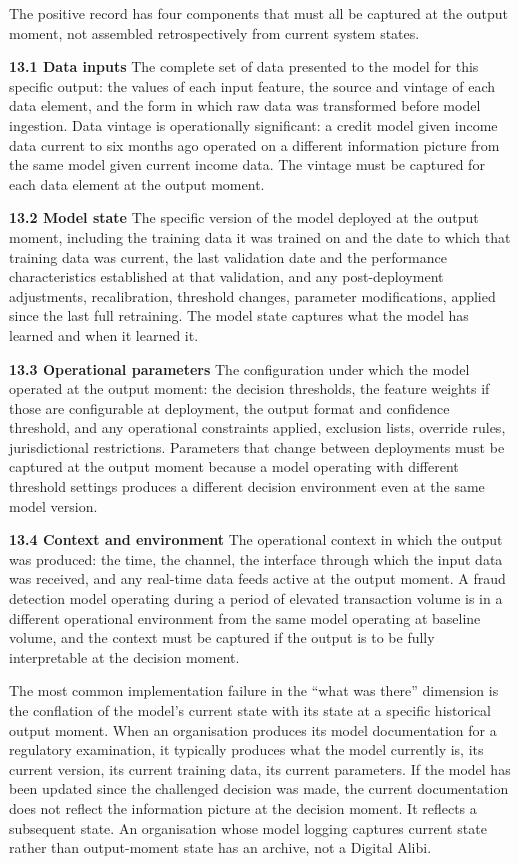The positive record has four components that must all be captured at the output moment, not assembled retrospectively from current system states.

\textbf{13.1 Data inputs} The complete set of data presented to the model for this specific output: the values of each input feature, the source and vintage of each data element, and the form in which raw data was transformed before model ingestion. Data vintage is operationally significant: a credit model given income data current to six months ago operated on a different information picture from the same model given current income data. The vintage must be captured for each data element at the output moment.

\textbf{13.2 Model state} The specific version of the model deployed at the output moment, including the training data it was trained on and the date to which that training data was current, the last validation date and the performance characteristics established at that validation, and any post-deployment adjustments, recalibration, threshold changes, parameter modifications, applied since the last full retraining. The model state captures what the model has learned and when it learned it.

\textbf{13.3 Operational parameters} The configuration under which the model operated at the output moment: the decision thresholds, the feature weights if those are configurable at deployment, the output format and confidence threshold, and any operational constraints applied, exclusion lists, override rules, jurisdictional restrictions. Parameters that change between deployments must be captured at the output moment because a model operating with different threshold settings produces a different decision environment even at the same model version.

\textbf{13.4 Context and environment} The operational context in which the output was produced: the time, the channel, the interface through which the input data was received, and any real-time data feeds active at the output moment. A fraud detection model operating during a period of elevated transaction volume is in a different operational environment from the same model operating at baseline volume, and the context must be captured if the output is to be fully interpretable at the decision moment.

The most common implementation failure in the ``what was there'' dimension is the conflation of the model's current state with its state at a specific historical output moment. When an organisation produces its model documentation for a regulatory examination, it typically produces what the model currently is, its current version, its current training data, its current parameters. If the model has been updated since the challenged decision was made, the current documentation does not reflect the information picture at the decision moment. It reflects a subsequent state. An organisation whose model logging captures current state rather than output-moment state has an archive, not a Digital Alibi.

